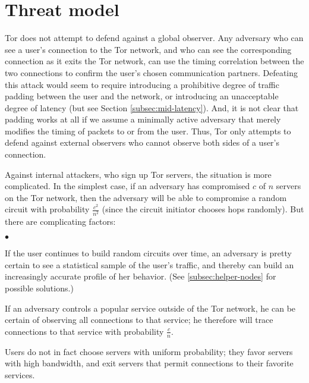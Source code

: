 \documentclass{llncs}
\newenvironment{tightlist}{\begin{list}{$\bullet$}{
  \setlength{\itemsep}{0mm}
    \setlength{\parsep}{0mm}
    }}{\end{list}}
\begin{document}
\section{Threat model}
\label{sec:threat-model}

Tor does not attempt to defend against a global observer.  Any adversary who
can see a user's connection to the Tor network, and who can see the
corresponding connection as it exits the Tor network, can use the timing
correlation between the two connections to confirm the user's chosen
communication partners.  Defeating this attack would seem to require
introducing a prohibitive degree of traffic padding between the user and the
network, or introducing an unacceptable degree of latency (but see
Section \ref{subsec:mid-latency}). 
And, it is not clear that padding works at all if we assume a
minimally active adversary that merely modifies the timing of packets
to or from the user. Thus, Tor only attempts to defend against
external observers who cannot observe both sides of a user's
connection.

Against internal attackers, who sign up Tor servers, the situation is more
complicated.  In the simplest case, if an adversary has compromised $c$ of
$n$ servers on the Tor network, then the adversary will be able to compromise
a random circuit with probability $\frac{c^2}{n^2}$ (since the circuit
initiator chooses hops randomly).  But there are
complicating factors:
\begin{tightlist}
\item If the user continues to build random circuits over time, an adversary
  is pretty certain to see a statistical sample of the user's traffic, and
  thereby can build an increasingly accurate profile of her behavior.  (See
  \ref{subsec:helper-nodes} for possible solutions.)
\item If an adversary controls a popular service outside of the Tor network,
  he can be certain of observing all connections to that service; he
  therefore will trace connections to that service with probability
  $\frac{c}{n}$.
\item Users do not in fact choose servers with uniform probability; they
  favor servers with high bandwidth, and exit servers that permit connections
  to their favorite services.
\end{tightlist}

%
\end{document}
